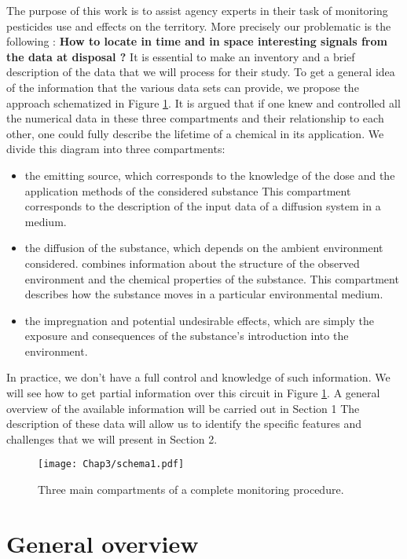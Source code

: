The purpose of this work is to assist agency experts in their task of monitoring pesticides use and effects on the territory. More precisely our problematic is the following : \textbf{How to locate in time and in space interesting signals from the data at disposal ?} It is essential to make an inventory and a brief description of the data that we will process for their study. To get a general idea of the information that the various data sets can provide, we propose the approach schematized in Figure \ref{fig:compartments}. It is argued that if one knew and controlled all the numerical data in these three compartments and their relationship to each other, one could fully describe the lifetime of a chemical in its application. We divide this diagram into three compartments: 
\begin{itemize}
    \item the emitting source, which corresponds to the knowledge of the dose and the application methods of the considered substance This compartment corresponds to the description of the input data of a diffusion system in a medium.
    \item the diffusion of the substance, which depends on the ambient environment considered. combines information about the structure of the observed environment and the chemical properties of the substance. This compartment describes how the substance moves in a particular environmental medium.
    \item the impregnation and potential undesirable effects, which are simply the exposure and consequences of the substance's introduction into the environment.
\end{itemize}
In practice, we don't have a full control and knowledge of such information. We will see how to get partial information over this circuit in Figure \ref{fig:compartments}. A general overview of the available information will be carried out in Section 1 The description of these data will allow us to identify the specific features and challenges that we will present in Section 2. 

\begin{figure}[ht]
    \centering
    \texttt{[image: Chap3/schema1.pdf]}
    \caption{Three main compartments of a complete monitoring procedure.}
    \label{fig:compartments}
\end{figure}

\section{General overview}

